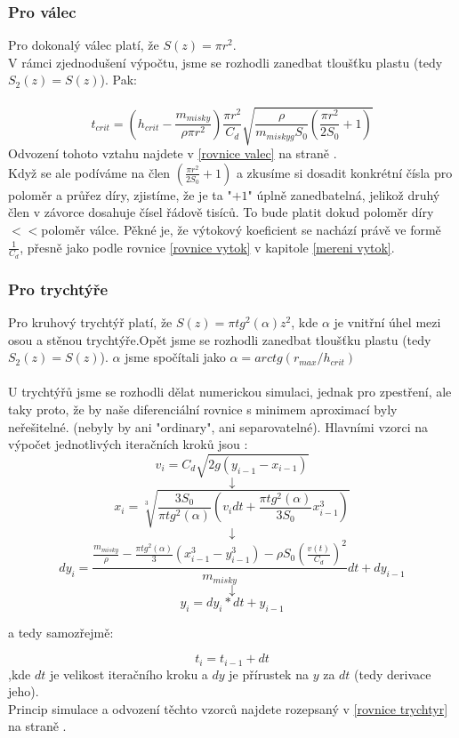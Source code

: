 \documentclass[14pt,a4paper]{article}
\begin{document}
\subsubsection{Pro válec}
Pro dokonalý válec platí, že $S(z)=\pi r^2$.\\
V rámci zjednodušení výpočtu, jsme se rozhodli zanedbat tloušťku plastu (tedy $S_2(z)=S(z)$). Pak:\\\\
\label{vztah valec}
$$t_{crit}=\left(h_{crit}-\frac{m_{misky}}{\rho \pi r^{2}}\right) \frac{\pi r^{2}}{C_d} \sqrt{\frac{\rho}{m_{misky g} S_0}\left(\frac{\pi r^{2}}{2S_0}+1\right)}$$
Odvození tohoto vztahu najdete v \ref{rovnice valec} na straně \pageref{rovnice valec}.\\
Když se ale podíváme na člen $\left(\frac{\pi r^2}{2S_0}+1\right)$ a zkusíme si dosadit konkrétní čísla pro poloměr a průřez díry, zjistíme, že je ta "$+1$" úplně zanedbatelná, jelikož druhý člen v závorce dosahuje čísel řádově tisíců. To bude platit dokud poloměr díry$<<$poloměr válce.
Pěkné je, že výtokový koeficient se nachází právě ve formě $\frac{1}{C_d}$, přesně jako podle rovnice \ref{rovnice vytok} v kapitole \ref{mereni vytok}.
\subsubsection{Pro trychtýře}
\label{vztah trychtyr}
Pro kruhový trychtýř platí, že $S(z)=\pi tg^2(\alpha)z^2$, kde $\alpha$ je vnitřní úhel mezi osou a stěnou trychtýře.Opět jsme se rozhodli zanedbat tloušťku plastu (tedy $S_2(z)=S(z)$). $\alpha$ jsme spočítali jako $\alpha=arctg(r_{max}/h_{crit})$\\\\
U trychtýřů jsme se rozhodli dělat numerickou simulaci, jednak pro zpestření, ale taky proto, že by naše diferenciální rovnice s minimem aproximací byly neřešitelné. (nebyly by ani "ordinary", ani separovatelné).
Hlavními vzorci na výpočet jednotlivých iteračních kroků jsou : $$v_i=C_d\sqrt{2g(y_{i-1}-x_{i-1})}$$$$ \downarrow$$ 
$$x_i=\sqrt[3]{\frac{3S_0}{\pi tg^2(\alpha)} \left(v_idt+\frac{\pi tg^2(\alpha)}{3S_0}x_{i-1}^{3}\right)}$$$$ \downarrow$$ 
$$dy_i=\frac{\frac{m_{misky}}{\rho}-\frac{\pi tg^{2}(\alpha)}{3}\left(x^{3}_{i-1}-y^{3}_{i-1}\right)-\rho S_0\left(\frac{v(t)}{C_d}\right)^2}{m_{misky}}dt+dy_{i-1}$$ 
$$ \downarrow$$ 
$$y_i=dy_i*dt+y_{i-1}$$
\begin{center}
a tedy samozřejmě:
\end{center} 
$$t_i=t_{i-1}+dt$$
,kde $dt$ je velikost iteračního kroku a $dy$ je přírustek na $y$ za $dt$ (tedy derivace jeho).\\
Princip simulace a odvození těchto vzorců najdete rozepsaný v \ref{rovnice trychtyr} na straně \pageref{rovnice trychtyr}.
\end{document}
